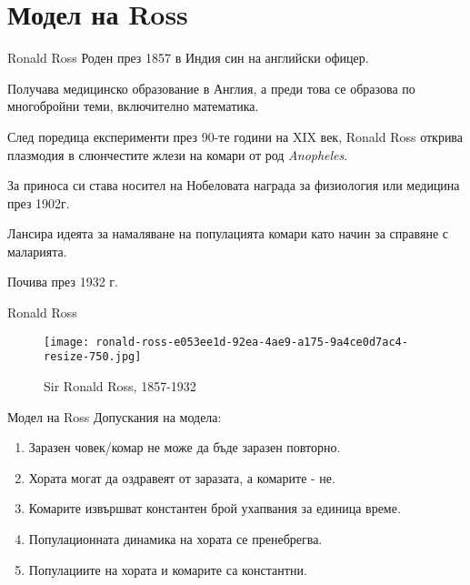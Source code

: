 \section{Модел на Ross}
\begin{frame}[t]{Ronald Ross}
  Роден през 1857 в Индия син на английски офицер.

  Получава медицинско образование в Англия, а преди това се образова по многобройни теми, включително математика.

  След поредица експерименти през 90-те години на XIX век, Ronald Ross открива плазмодия в слюнчестите жлези на комари от род \textit{Anopheles}.

  За приноса си става носител на Нобеловата награда за физиология или медицина през 1902г.

  Лансира идеята за намаляване на популацията комари като начин за справяне с маларията.

  Почива през 1932 г.
\end{frame}

\begin{frame}[t]{Ronald Ross}
  \begin{figure}
    \texttt{[image: ronald-ross-e053ee1d-92ea-4ae9-a175-9a4ce0d7ac4-resize-750.jpg]}
    \centering
    \caption{Sir Ronald Ross, 1857-1932}
  \end{figure}
\end{frame}

\begin{frame}[t]{Модел на Ross}
  Допускания на модела:
  \begin{enumerate}
    \item Заразен човек/комар не може да бъде заразен повторно.
    \item Хората могат да оздравеят от заразата, а комарите - не.
    \item Комарите извършват константен брой ухапвания за единица време.
    \item Популационната динамика на хората се пренебрегва.
    \item Популациите на хората и комарите са константни.
  \end{enumerate}
\end{frame}

